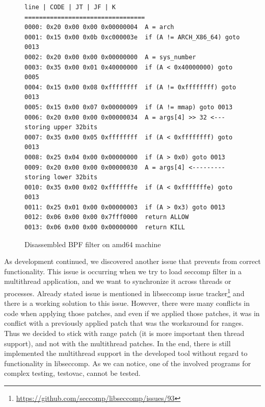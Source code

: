 \begin{figure}[h]
	\label{BPF_rule}
	\lstset{style=npl}
	\begin{lstlisting}
line | CODE | JT | JF | K
=================================
0000: 0x20 0x00 0x00 0x00000004  A = arch
0001: 0x15 0x00 0x0b 0xc000003e  if (A != ARCH_X86_64) goto 0013
0002: 0x20 0x00 0x00 0x00000000  A = sys_number
0003: 0x35 0x00 0x01 0x40000000  if (A < 0x40000000) goto 0005
0004: 0x15 0x00 0x08 0xffffffff  if (A != 0xffffffff) goto 0013
0005: 0x15 0x00 0x07 0x00000009  if (A != mmap) goto 0013
0006: 0x20 0x00 0x00 0x00000034  A = args[4] >> 32 <--- storing upper 32bits
0007: 0x35 0x00 0x05 0xffffffff  if (A < 0xffffffff) goto 0013
0008: 0x25 0x04 0x00 0x00000000  if (A > 0x0) goto 0013
0009: 0x20 0x00 0x00 0x00000030  A = args[4] <--------- storing lower 32bits
0010: 0x35 0x00 0x02 0xfffffffe  if (A < 0xfffffffe) goto 0013
0011: 0x25 0x01 0x00 0x00000003  if (A > 0x3) goto 0013
0012: 0x06 0x00 0x00 0x7fff0000  return ALLOW
0013: 0x06 0x00 0x00 0x00000000  return KILL
	\end{lstlisting}
	\caption{Disassembled BPF filter on amd64 machine}
\end{figure}

As development continued, we discovered another issue that prevents from correct
functionality. This issue is occurring when we try to load seccomp filter in a
multithread application, and we want to synchronize it across threads or
processes. Already stated issue is mentioned in libseccomp issue
tracker\footnote{\url{https://github.com/seccomp/libseccomp/issues/93}} and
there is a working solution to this issue. However, there were many conflicts in
code when applying those patches, and even if we applied those patches, it was
in conflict with a previously applied patch that was the workaround for ranges.
Thus we decided to stick with range patch (it is more important then thread
support), and not with the multithread patches. In the end, there is still
implemented the multithread support in the developed tool without regard to
functionality in libseccomp. As we can notice, one of the involved programs for
complex testing, testovac, cannot be tested.

